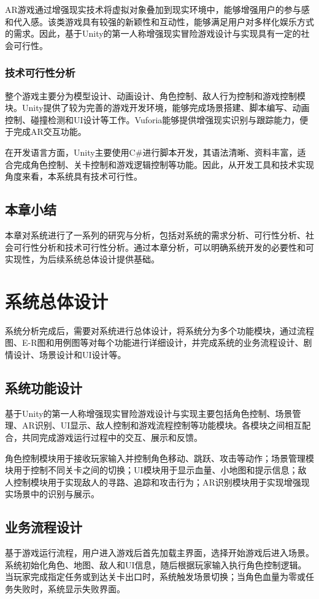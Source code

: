 \documentclass[12pt]{graduate-design-manual}
\begin{document}
AR游戏通过增强现实技术将虚拟对象叠加到现实环境中，能够增强用户的参与感和代入感。该类游戏具有较强的新颖性和互动性，能够满足用户对多样化娱乐方式的需求。因此，基于Unity的第一人称增强现实冒险游戏设计与实现具有一定的社会可行性。

\subsubsection{技术可行性分析}
整个游戏主要分为模型设计、动画设计、角色控制、敌人行为控制和游戏控制模块。Unity提供了较为完善的游戏开发环境，能够完成场景搭建、脚本编写、动画控制、碰撞检测和UI设计等工作。Vuforia能够提供增强现实识别与跟踪能力，便于完成AR交互功能。

在开发语言方面，Unity主要使用C\#进行脚本开发，其语法清晰、资料丰富，适合完成角色控制、关卡控制和游戏逻辑控制等功能。因此，从开发工具和技术实现角度来看，本系统具有技术可行性。

\subsection{本章小结}
本章对系统进行了一系列的研究与分析，包括对系统的需求分析、可行性分析、社会可行性分析和技术可行性分析。通过本章分析，可以明确系统开发的必要性和可实现性，为后续系统总体设计提供基础。

\section{系统总体设计}
系统分析完成后，需要对系统进行总体设计，将系统分为多个功能模块，通过流程图、E-R图和用例图等对每个功能进行详细设计，并完成系统的业务流程设计、剧情设计、场景设计和UI设计等。

\subsection{系统功能设计}
基于Unity的第一人称增强现实冒险游戏设计与实现主要包括角色控制、场景管理、AR识别、UI显示、敌人控制和游戏流程控制等功能模块。各模块之间相互配合，共同完成游戏运行过程中的交互、展示和反馈。

角色控制模块用于接收玩家输入并控制角色移动、跳跃、攻击等动作；场景管理模块用于控制不同关卡之间的切换；UI模块用于显示血量、小地图和提示信息；敌人控制模块用于实现敌人的寻路、追踪和攻击行为；AR识别模块用于实现增强现实场景中的识别与展示。

\subsection{业务流程设计}
基于游戏运行流程，用户进入游戏后首先加载主界面，选择开始游戏后进入场景。系统初始化角色、地图、敌人和UI信息，随后根据玩家输入执行角色控制逻辑。当玩家完成指定任务或到达关卡出口时，系统触发场景切换；当角色血量为零或任务失败时，系统显示失败界面。
\end{document}
